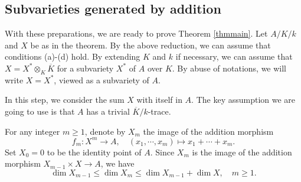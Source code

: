 \subsection{Subvarieties generated by addition}

With these preparations, we are ready to prove Theorem \ref{thmmain}.
Let $A/K/k$ and $X$ be as in the theorem.
By the above reduction, we can assume that conditions (a)-(d) hold.
By extending $K$ and $k$ if necessary, we can assume that $X=X^*\otimes_K \overline K$ for a subvariety $X^*$ of $A$ over $K$.
By abuse of notations, we will write $X=X^*$, viewed as a subvariety of $A$.

In this step, we consider the sum $X$ with itself in $A$. The key assumption we are going to use is that $A$ has a trivial $\overline K/k$-trace.

For any integer $m\geq1$, denote by $X_m$ the image of the addition morphism
$$f_m:X^m\longrightarrow A, \quad
(x_1,\cdots, x_m) \longmapsto x_1+ \cdots+ x_m.$$
Set $X_0=0$ to be the identity point of $A$.
Since $X_m$ is the image of the addition morphism
$X_{m-1}\times X\to A$, we have
$$\dim X_{m-1}\leq \dim X_m\leq \dim X_{m-1}+\dim X, \quad m\geq1.$$

